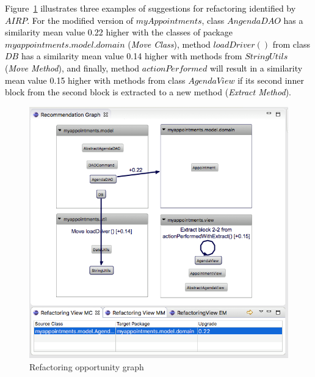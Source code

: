 \documentclass[smallextended,natbib]{svjour3}
\begin{document}
{\textcolor{black}{Figure~\ref{fig:graph} illustrates three examples of suggestions for refactoring identified by $AIRP$. For the modified version of $myAppointments$, class $AngendaDAO$ has a similarity mean value 0.22 higher with the classes of package $myappointments.model.domain$ (\textit{Move Class}), method $loadDriver()$ from class $DB$ has a similarity mean value 0.14 higher with methods from $StringUtils$ (\textit{Move Method}), and finally, method $actionPerformed$ will result in a similarity mean value 0.15 higher with methods from class $AgendaView$ if its second inner block from the second block is extracted to a new method (\textit{Extract Method}).}

\begin{figure}[htbp]
\centering
\includegraphics[scale=0.4]{graph.png}
\vspace{-5pt}
\caption{Refactoring opportunity graph}
\vspace{-10pt}
\label{fig:graph}
\end{figure}


}
\end{document}

